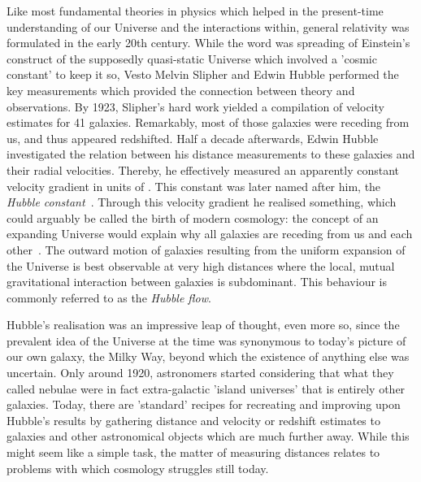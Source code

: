 
Like most fundamental theories in physics which helped in the present-time
understanding of our Universe and the interactions within, general relativity
was formulated in the early 20th century.  While the word was spreading of
Einstein's construct of the supposedly quasi-static Universe which involved a
'cosmic constant' to keep it so, Vesto Melvin Slipher and Edwin Hubble performed
the key measurements which provided the connection between theory and
observations.  By 1923, Slipher's hard work yielded a compilation of velocity
estimates for 41 galaxies.  Remarkably, most of those galaxies were receding
from us, and thus appeared redshifted.  Half a decade afterwards, Edwin Hubble investigated the relation
between his distance measurements to these galaxies and their radial velocities.
Thereby, he effectively measured an apparently constant velocity gradient in
units of \Hunitsalt.  This constant was later named after him, the
\textit{Hubble constant}~\Ho.  Through this velocity gradient he realised
something, which could arguably be called the birth of modern cosmology: the
concept of an expanding Universe would explain why all galaxies are receding
from us and each other~.  The outward motion of galaxies resulting
from the uniform expansion of the Universe is best observable at very high
distances where the local, mutual gravitational interaction between galaxies is
subdominant.  This behaviour is commonly referred to as the \textit{Hubble
flow}.

Hubble's realisation was an impressive leap of thought, even more so, since the
prevalent idea of the Universe at the time was synonymous to today's picture of
our own galaxy, the Milky Way, beyond which the existence of anything else was
uncertain.  Only around 1920, astronomers started considering that what they
called nebulae were in fact extra-galactic 'island universes' that is entirely
other galaxies.  Today, there are 'standard' recipes for recreating and
improving upon Hubble's results by
gathering distance and velocity or redshift estimates to galaxies and other
astronomical objects which are much further away.  While this might seem like a
simple task, the matter of measuring distances relates to problems with which
cosmology struggles still today.  


